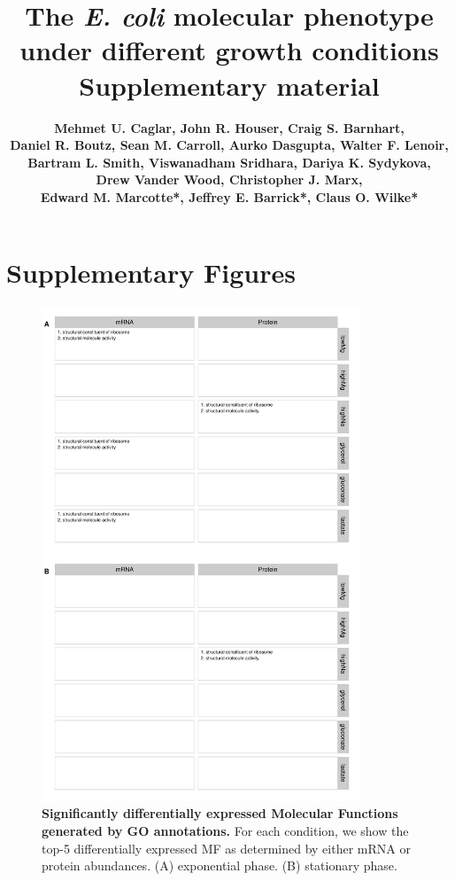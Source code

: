 \documentclass[a4paper]{article}
\title{\huge\bfseries \vspace{2cm} The \textit{E. coli} molecular phenotype under different growth conditions \\ \vspace{0.7cm}
	\Large\bfseries Supplementary material \vspace{1.3cm}}
\author{
	\large\bfseries Mehmet U. Caglar, John R. Houser, Craig S. Barnhart, \\
	\large\bfseries Daniel R. Boutz, Sean M. Carroll, Aurko Dasgupta, Walter F. Lenoir,\\ 
	\large\bfseries Bartram L. Smith, Viswanadham Sridhara, Dariya K. Sydykova, \\
	\large\bfseries Drew Vander Wood, Christopher J. Marx, \\
	\large\bfseries Edward M. Marcotte*, Jeffrey E. Barrick*, Claus O. Wilke*}
\begin{document}
\maketitle
\newpage
	
	
	
\tableofcontents
\listoffigures
\listoftables

\newpage

\section*{Supplementary Figures}

\begin{figure}[!htb]
	\includegraphics[width=0.85\textwidth]{../supplementary_figures/figS1_ResultSumamryFigures_mf.pdf}
	\caption[Summary GO annotations]
	{\textbf{Significantly differentially expressed Molecular Functions generated by GO annotations.} For each condition, we show the top-5 differentially expressed MF as determined by either mRNA or protein abundances. (A) exponential phase. (B) stationary phase.}
\end{figure}
\end{document}

